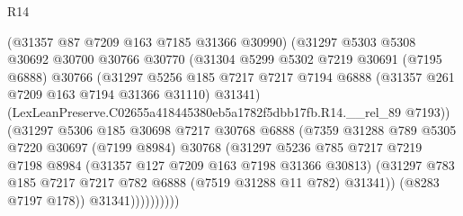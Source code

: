 \begin{lexlean}{R14}
\begin{coremodule}
                            (@31357 @87 @7209 @163 @7185 @31366 @30990)
                            (@31297
                              @5303
                              @5308
                              @30692
                              @30700
                              @30766
                              @30770
                              (@31304
                                @5299
                                @5302
                                @7219
                                @30691
                                (@7195 @6888)
                                @30766
                                (@31297
                                  @5256
                                  @185
                                  @7217
                                  @7217
                                  @7194
                                  @6888
                                  (@31357 @261 @7209 @163 @7194 @31366 @31110)
                                  @31341)
                                (LexLeanPreserve.C02655a418445380eb5a1782f5dbb17fb.R14.__rel_89
                                  @7193))
                              (@31297
                                @5306
                                @185
                                @30698
                                @7217
                                @30768
                                @6888
                                (@7359
                                  @31288
                                  @789
                                  @5305
                                  @7220
                                  @30697
                                  (@7199 @8984)
                                  @30768
                                  (@31297
                                    @5236
                                    @785
                                    @7217
                                    @7219
                                    @7198
                                    @8984
                                    (@31357 @127 @7209 @163 @7198 @31366 @30813)
                                    (@31297
                                      @783
                                      @185
                                      @7217
                                      @7217
                                      @782
                                      @6888
                                      (@7519 @31288 @11 @782)
                                      @31341))
                                  (@8283 @7197 @178))
                                @31341))))))))))

\end{coremodule}
\end{lexlean}
